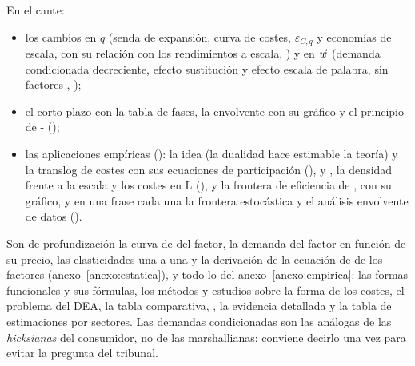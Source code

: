 \documentclass[11pt]{article}
\begin{document}
\begin{notaopositor}
En el cante:
\begin{itemize}
\item los cambios en $q$ (senda de expansión, curva de costes, $\varepsilon_{C,q}$ y economías de escala, con su relación con los rendimientos a escala, ) y en $\vec{w}$ (demanda condicionada decreciente, efecto sustitución y efecto escala de palabra, sin factores , );
\item el corto plazo con la tabla de fases, la envolvente con su gráfico y el principio de - ();
\item las aplicaciones empíricas (): la idea (la dualidad hace estimable la teoría) y la translog de costes con sus ecuaciones de participación (),  y , la densidad frente a la escala y los costes en L (), y la frontera de eficiencia de , con su gráfico, y en una frase cada una la frontera estocástica y el análisis envolvente de datos ().
\end{itemize}
Son de profundización la curva de  del factor, la demanda del factor en función de su precio, las elasticidades una a una y la derivación de la ecuación de  de los factores (anexo~\ref{anexo:estatica}), y todo lo del anexo~\ref{anexo:empirica}: las formas funcionales y sus fórmulas, los métodos y estudios sobre la forma de los costes, el problema del DEA, la tabla comparativa, , la evidencia detallada y la tabla de estimaciones por sectores. Las demandas condicionadas son las análogas de las \emph{hicksianas} del consumidor, no de las marshallianas: conviene decirlo una vez para evitar la pregunta del tribunal.
\end{notaopositor}
\end{document}
